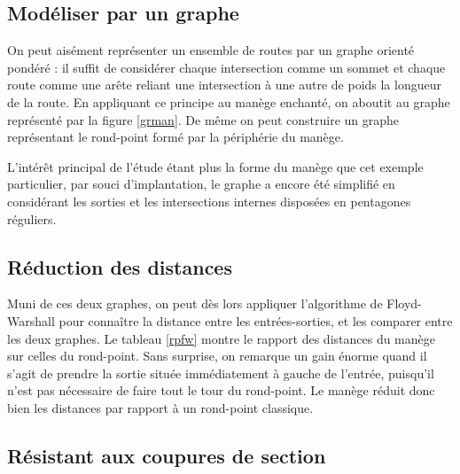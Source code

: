 \documentclass[11pt]{article}
\begin{document}
	\subsection{Modéliser par un graphe}

On peut aisément représenter un ensemble de routes par un graphe orienté pondéré : il suffit de considérer chaque intersection comme un sommet et chaque route comme une arête reliant une intersection à une autre de poids la longueur de la route. En appliquant ce principe au manège enchanté, on aboutit au graphe représenté par la figure \ref{grman}. De même on peut construire un graphe représentant le rond-point formé par la périphérie du manège. \par
L'intérêt principal de l'étude étant plus la forme du manège que cet exemple particulier, par souci d'implantation, le graphe a encore été simplifié en considérant les sorties et les intersections internes disposées en pentagones réguliers.

	
	\subsection{Réduction des distances}
Muni de ces deux graphes, on peut dès lors appliquer l'algorithme de Floyd-Warshall pour connaître la distance entre les entrées-sorties, et les comparer entre les deux graphes. Le tableau \ref{rpfw} montre le rapport des distances du manège sur celles du rond-point. Sans surprise, on remarque un gain énorme quand il s'agit de prendre la sortie située immédiatement à gauche de l'entrée, puisqu'il n'est pas nécessaire de faire tout le tour du rond-point. Le manège réduit donc bien les distances par rapport à un rond-point classique.

	\subsection{Résistant aux coupures de section}
\end{document}
